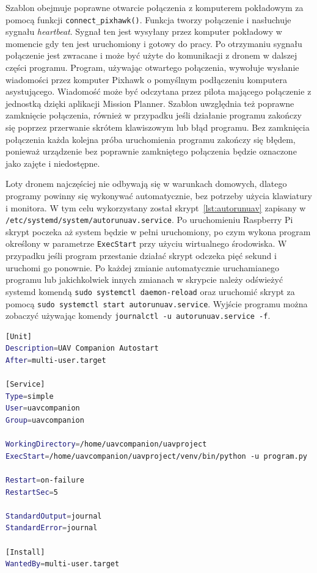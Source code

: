 \documentclass[a4paper,12pt]{book}
\begin{document}
        
        Szablon obejmuje poprawne otwarcie połączenia z komputerem pokładowym za pomocą funkcji \texttt{connect\_pixhawk()}.  Funkcja tworzy połączenie i nasłuchuje sygnału \textit{heartbeat}. Sygnał ten jest wysyłany przez komputer pokładowy w momencie gdy ten jest 
        uruchomiony i gotowy do pracy. Po otrzymaniu sygnału połączenie jest zwracane i może być użyte do komunikacji z dronem w dalszej części programu. Program, używając otwartego połączenia, wywołuje wysłanie wiadomości przez komputer Pixhawk 
        o pomyślnym podłączeniu komputera asystującego. Wiadomość może być odczytana przez pilota mającego połączenie z jednostką dzięki aplikacji Mission Planner. Szablon uwzględnia też poprawne zamknięcie połączenia, również w przypadku jeśli działanie programu zakończy się poprzez przerwanie skrótem klawiszowym lub błąd programu. 
        Bez zamknięcia połączenia każda kolejna próba uruchomienia programu zakończy się błędem, ponieważ urządzenie bez poprawnie zamkniętego połączenia będzie oznaczone jako zajęte i niedostępne.\par 
        Loty dronem najczęściej nie odbywają się w warunkach domowych, dlatego programy powinny się wykonywać automatycznie, bez potrzeby użycia klawiatury i monitora. W tym celu wykorzystany został skrypt~\ref{lst:autorunuav} zapisany w \texttt{/etc/systemd/system/autorunuav.service}. Po uruchomieniu Raspberry Pi 
        skrypt poczeka aż system będzie w pełni uruchomiony, po czym wykona program określony w parametrze \texttt{ExecStart} przy użyciu wirtualnego środowiska. W przypadku jeśli program przestanie działać skrypt odczeka pięć sekund i uruchomi go ponownie. Po każdej zmianie automatycznie uruchamianego programu lub 
        jakichkolwiek innych zmianach w skrypcie należy odświeżyć systemd komendą \texttt{sudo systemctl daemon-reload} oraz uruchomić skrypt za pomocą \texttt{sudo systemctl start autorunuav.service}. Wyjście programu można zobaczyć używając komendy \texttt{journalctl -u autorunuav.service -f}.

        \begin{lstlisting}[language=bash, caption={Skrypt wykonujący program po uruchomieniu komputera asystującego}, label={lst:autorunuav}]
[Unit]
Description=UAV Companion Autostart
After=multi-user.target

[Service]
Type=simple
User=uavcompanion
Group=uavcompanion

WorkingDirectory=/home/uavcompanion/uavproject
ExecStart=/home/uavcompanion/uavproject/venv/bin/python -u program.py

Restart=on-failure
RestartSec=5

StandardOutput=journal
StandardError=journal

[Install]
WantedBy=multi-user.target
        \end{lstlisting}
\end{document}
